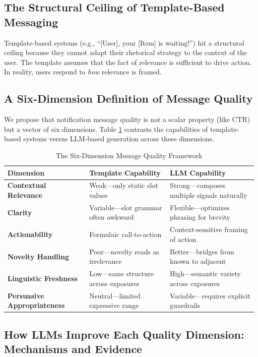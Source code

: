 \documentclass[sigconf]{acmart}
\begin{document}
\subsection{The Structural Ceiling of Template-Based Messaging}

Template-based systems (e.g., ``[User], your [Item] is waiting!'') hit a structural ceiling because they cannot adapt their rhetorical strategy to the context of the user. The template assumes that the fact of relevance is sufficient to drive action. In reality, users respond to \textit{how} relevance is framed. 

\subsection{A Six-Dimension Definition of Message Quality}

We propose that notification message quality is not a scalar property (like CTR) but a vector of six dimensions. Table \ref{tab:quality_framework} contrasts the capabilities of template-based systems versus LLM-based generation across these dimensions.

\begin{table}[t]
\caption{The Six-Dimension Message Quality Framework}
\label{tab:quality_framework}
\begin{tabular}{p{3.5cm}p{5.5cm}p{5.5cm}}
\toprule
\textbf{Dimension} & \textbf{Template Capability} & \textbf{LLM Capability} \\
\midrule
\textbf{Contextual Relevance} & Weak---only static slot values & Strong---composes multiple signals naturally \\
\textbf{Clarity} & Variable---slot grammar often awkward & Flexible---optimizes phrasing for brevity \\
\textbf{Actionability} & Formulaic call-to-action & Context-sensitive framing of action \\
\textbf{Novelty Handling} & Poor---novelty reads as irrelevance & Better---bridges from known to adjacent \\
\textbf{Linguistic Freshness} & Low---same structure across exposures & High---semantic variety across exposures \\
\textbf{Persuasive Appropriateness} & Neutral---limited expressive range & Variable---requires explicit guardrails \\
\bottomrule
\end{tabular}
\end{table}

\subsection{How LLMs Improve Each Quality Dimension: Mechanisms and Evidence}
\end{document}
